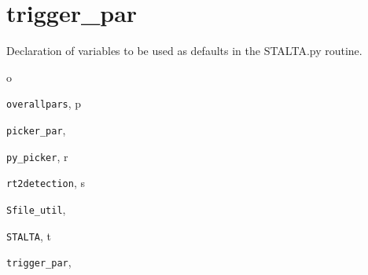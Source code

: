 \documentclass[letterpaper,10pt,english]{sphinxmanual}
\begin{document}
\section{trigger\_par}
\label{modules:trigger-par}\label{modules:module-trigger_par}
Declaration of variables to be used as defaults in the STALTA.py
routine.


\renewcommand{\indexname}{Python Module Index}
\begin{theindex}
\def\bigletter#1{{\Large\sffamily#1}\nopagebreak\vspace{1mm}}
\bigletter{o}
\item {\texttt{overallpars}}, \pageref{modules:module-overallpars}
\indexspace
\bigletter{p}
\item {\texttt{picker\_par}}, \pageref{modules:module-picker_par}
\item {\texttt{py\_picker}}, \pageref{modules:module-py_picker}
\indexspace
\bigletter{r}
\item {\texttt{rt2detection}}, \pageref{modules:module-rt2detection}
\indexspace
\bigletter{s}
\item {\texttt{Sfile\_util}}, \pageref{modules:module-Sfile_util}
\item {\texttt{STALTA}}, \pageref{modules:module-STALTA}
\indexspace
\bigletter{t}
\item {\texttt{trigger\_par}}, \pageref{modules:module-trigger_par}
\end{theindex}

\renewcommand{\indexname}{Index}
\printindex
\end{document}
